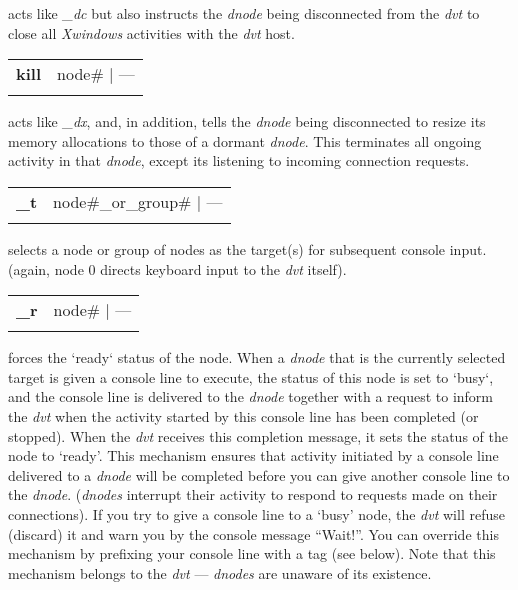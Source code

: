 \noindent acts like \emph{\_dc} but also instructs the \emph{dnode} being disconnected from the \emph{dvt} to close all \emph{Xwindows} activities with the \emph{dvt} host.\\

\begin{tabular}{>{\sffamily\bfseries}l>{\sffamily}l}
kill    & node\#  $|$ ---\\\\
\end{tabular}

\noindent acts like \emph{\_dx}, and, in addition, tells the \emph{dnode} being disconnected to resize its memory allocations to those of a dormant \emph{dnode}. This terminates all ongoing activity in that \emph{dnode}, except its listening to incoming connection requests.\\

\begin{tabular}{>{\sffamily\bfseries}l>{\sffamily}l}
\_t    & node\#\_or\_group\#  $|$ ---\\\\
\end{tabular} 

\noindent selects a node or group of nodes as the target(s) for subsequent console input. (again, node $0$ directs keyboard input to the \emph{dvt} itself).\\

\begin{tabular}{>{\sffamily\bfseries}l>{\sffamily}l}
\_r    & node\#  $|$ ---\\\\
\end{tabular} 

\noindent forces the `ready` status of the node. When a \emph{dnode} that is the currently selected target is given a console line to execute, the status of this node is set to `busy`, and the console line is delivered to the \emph{dnode} together with a request to inform the \emph{dvt} when the activity started by this console line has been completed (or stopped). When the \emph{dvt} receives this completion message, it sets the status of the node to `ready'. This mechanism ensures that activity initiated by a console line delivered to a \emph{dnode} will be completed before you can give another console line to the \emph{dnode}. (\emph{dnodes} interrupt their activity to respond to requests made on their connections). If you try to give a console line to a `busy' node, the \emph{dvt} will refuse (discard) it and warn you by the console message ``Wait!''. You can override this mechanism by prefixing your console line with a tag (see below). Note that this mechanism belongs to the \emph{dvt} --- \emph{dnodes} are unaware of its existence.


